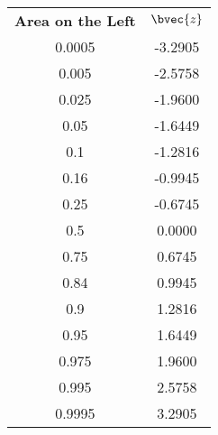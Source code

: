 \begin{center}
\begin{tabular}{cc}
{\bf Area on the Left} & $\bvec{z}$\\
0.0005 & -3.2905\\
0.005 & -2.5758\\
0.025 & -1.9600\\
0.05 & -1.6449\\
0.1 & -1.2816\\
0.16 & -0.9945\\
0.25 & -0.6745\\
0.5 & 0.0000\\
0.75 & 0.6745\\
0.84 & 0.9945\\
0.9 & 1.2816\\
0.95 & 1.6449\\
0.975 & 1.9600\\
0.995 & 2.5758\\
0.9995 & 3.2905\\
\end{tabular}
\end{center}